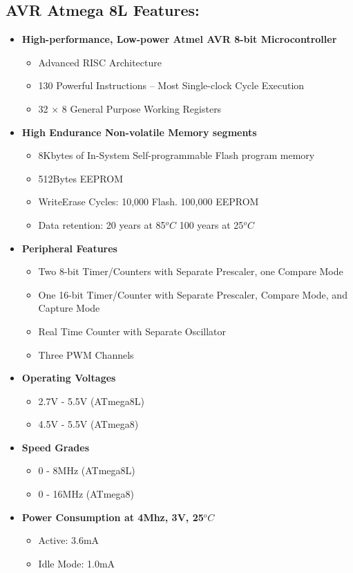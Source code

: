 \documentclass[12pt, a4paper]{article}
\begin{document}
\begin{appendices}
\section{AVR Atmega 8L Features:}
\begin{itemize}
\item \textbf{High-performance, Low-power Atmel AVR 8-bit Microcontroller}
\begin{itemize}
\item Advanced \ac{RISC} Architecture
\item 130 Powerful Instructions – Most Single-clock Cycle Execution
\item 32 × 8 General Purpose Working Registers
\end{itemize}
\item \textbf{High Endurance Non-volatile Memory segments}
\begin{itemize}
\item 8Kbytes of In-System Self-programmable Flash program memory
\item 512Bytes EEPROM
\item WriteErase Cycles: 10,000 Flash. 100,000 \ac{EEPROM}
\item Data retention: 20 years at 85$^oC$ 100 years at 25$^oC$
\end{itemize}
\item \textbf{Peripheral Features}
\begin{itemize}
\item Two 8-bit Timer/Counters with Separate Prescaler, one Compare Mode
\item One 16-bit Timer/Counter with Separate Prescaler, Compare Mode, and Capture Mode
\item Real Time Counter with Separate Oscillator
\item Three PWM Channels
\end{itemize}
\item \textbf{Operating Voltages}
\begin{itemize}
\item 2.7V - 5.5V (ATmega8L)
\item 4.5V - 5.5V (ATmega8)
\end{itemize}
\item \textbf{Speed Grades}
\begin{itemize}
\item 0 - 8MHz (ATmega8L)
\item 0 - 16MHz (ATmega8)
\end{itemize}
\item \textbf{Power Consumption at 4Mhz, 3V, 25$^oC$}
\begin{itemize}
\item Active: 3.6mA
\item Idle Mode: 1.0mA
\end{itemize}
\end{itemize}
\newpage


\end{appendices}
\end{document}

